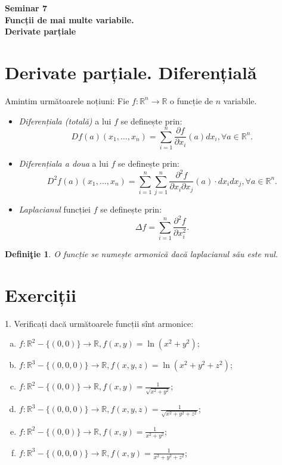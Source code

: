 \documentclass[11pt,a4paper]{article}
\newcommand\RR{\mathbb{R}}
\theoremstyle{dotless}
\theoremstyle{dotlessdr}
\newtheorem{definition}{Defini\c{t}ie}[section]
\begin{document}
\begin{center}
  {\large\textbf{Seminar 7 \\ Funcții de mai multe variabile. \\ Derivate parțiale }}
\end{center}

\section{Derivate parțiale. Diferențială}
\label{sec:der-dif}

Amintim următoarele noțiuni: Fie $f : \RR^n \to \RR$ o funcție de $n$ variabile.
\begin{itemize}
\item \emph{Diferențiala (totală)} a lui $f$ se definește prin:
  \[
    Df(a)(x_1, \dots, x_n) = \sum_{i = 1}^n \frac{\partial f}{\partial x_i}(a) dx_i, \forall a \in \RR^n.
  \]
\item \emph{Diferențiala a doua} a lui $f$ se definește prin:
  \[
    D^2f(a)(x_1, \dots, x_n) = \sum_{i = 1}^n \sum_{j = 1}^n \frac{\partial^2 f}{\partial x_i \partial x_j} (a)
    \cdot dx_i dx_j, \forall a \in \RR^n.
  \]
\item \emph{Laplacianul} funcției $f$ se definește prin:
  \[
    \Delta f = \sum_{i = 1}^n \frac{\partial^2 f}{\partial x_i^2}.
  \]
\end{itemize}

\begin{definition}\label{def:armonica}
  O funcție se numește \emph{armonică} dacă laplacianul său este nul.
\end{definition}


\section{Exerciții}
\label{sec:exc}

1. Verificați dacă următoarele funcții sînt armonice:
\begin{enumerate}[(a)]
\item $f : \RR^2 - \{(0, 0)\} \to \RR, f(x, y) = \ln(x^2 + y^2)$;
\item $f : \RR^3 - \{ (0, 0, 0) \} \to \RR, f(x, y, z) = \ln(x^2 + y^2 + z^2)$;
\item $f : \RR^2 - \{ (0, 0) \} \to \RR, f(x, y) = \frac{1}{\sqrt{x^2 + y^2}}$;
\item $f : \RR^3 - \{ (0, 0, 0) \} \to \RR, f(x, y, z) = \frac{1}{\sqrt{x^2 + y^2 + z^2}}$;
\item $f : \RR^2 - \{ (0, 0) \} \to \RR, f(x, y) = \frac{1}{x^2 + y^2}$;
\item $f : \RR^3 - \{ (0, 0, 0) \} \to \RR, f(x, y) = \frac{1}{x^2 + y^2 + z^2}$;
\end{enumerate}
\end{document}
